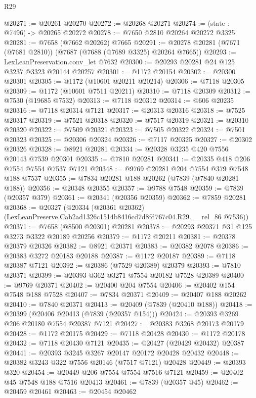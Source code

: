 \begin{lexlean}{R29}
\begin{coremodule}
@20271 := @20261 @20270
@20272 := @20268 @20271
@20274 := (state : @7496) -> @20265 @20272
@20278 := @7650 @2810 @20264 @20272 @3325
@20281 := @7658 (@7662 @20262) @7665
@20291 := @20278 @20281 (@7671 (@7681 @2810)) (@7687 (@7688 (@7689 @3325) @20264 @7665))
@20293 := LexLeanPreservation.conv_let @7632
@20300 := @20293 @20281 @24 @125 @3237 @3323 @20144 @20257
@20301 := @1172 @20154
@20302 := @20300 @20301
@20305 := @1172 (@10601 @20211 @20214)
@20306 := @7118 @20305
@20309 := @1172 (@10601 @7511 @20211)
@20310 := @7118 @20309
@20312 := @7530 (@19685 @7532)
@20313 := @7118 @20312
@20314 := @606 @20235
@20316 := @7118 @20314 @7121
@20317 := @20313 @20316
@20318 := @7525 @20317
@20319 := @7521 @20318
@20320 := @7517 @20319
@20321 := @20310 @20320
@20322 := @7509 @20321
@20323 := @7505 @20322
@20324 := @7501 @20323
@20325 := @20306 @20324
@20326 := @7117 @20325
@20327 := @20302 @20326
@20328 := @8921 @20281
@20334 := @20328 @3235 @420 @7556 @20143 @7539 @20301
@20335 := @7810 @20281
@20341 := @20335 @418 @206 @7554 @7554 @7537 @7121
@20348 := @9769 @20281 @204 @7554 @379 @7548 @188 @7537
@20355 := @7834 @20281 @188 @20262 (@7839 (@7840 @20281 @188))
@20356 := @20348 @20355
@20357 := @9788 @7548
@20359 := @7839 (@20357 @379)
@20361 := @20341 (@20356 @20359)
@20362 := @7859 @20281
@20368 := @20327
    (@20334 (@20361 @20362) (LexLeanPreserve.Cab2ad1326c1514b8416cd7d8fd767c04.R29.__rel_86 @7536))
@20371 := @7658 (@8500 @20301) @20281
@20378 := @20293 @20371 @31 @125 @3273 @3322 @20189 @20256
@20379 := @1172 @20211
@20381 := @20378 @20379 @20326
@20382 := @8921 @20371
@20383 := @20382 @2078
@20386 := @20383 @3272 @20183 @20188
@20387 := @1172 @20187
@20389 := @7118 @20387 @7121
@20392 := @20386 (@7529 @20389) @20379
@20393 := @7810 @20371
@20399 := @20393 @362 @3271 @7554 @20182 @7528 @20389
@20400 := @9769 @20371
@20402 := @20400 @204 @7554
@20406 := @20402 @154 @7548 @188 @7528
@20407 := @7834 @20371
@20409 := @20407 @188 @20262
@20410 := @7840 @20371
@20413 := @20409 (@7839 (@20410 @188))
@20418 := @20399 (@20406 @20413 (@7839 (@20357 @154)))
@20424 := @20393 @3269 @206 @20180 @7554 @20387 @7121
@20427 := @20383 @3268 @20173 @20179
@20428 := @1172 @20175
@20429 := @7118 @20428
@20430 := @1172 @20178
@20432 := @7118 @20430 @7121
@20435 := @20427 (@20429 @20432) @20387
@20441 := @20393 @3245 @3267 @20147 @20172 @20428 @20432
@20448 := @20382 @3243 @322 @7556 @20146 (@7517 @7121) @20428
@20449 := @20393 @320
@20454 := @20449 @206 @7554 @7554 @7516 @7121
@20459 := @20402 @45 @7548 @188 @7516 @20413
@20461 := @7839 (@20357 @45)
@20462 := @20459 @20461
@20463 := @20454 @20462

\end{coremodule}
\end{lexlean}
